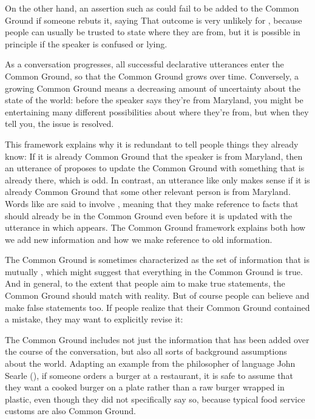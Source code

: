 On the other hand, an assertion such as  could fail to be added to the Common Ground if someone rebuts it, saying   That outcome is very unlikely for , because people can usually be trusted to state where they are from, but it is possible in principle if the speaker is confused or lying.

As a conversation progresses, all successful declarative utterances enter the Common Ground, so that the Common Ground grows over time.  Conversely, a growing Common Ground means a decreasing amount of uncertainty about the state of the world: before the speaker says they're from Maryland,   you might be entertaining many different possibilities about where they're from, but when they tell you, the issue is resolved.  

This framework explains why it is redundant to tell people things they already know: If it is already Common Ground that the speaker is from Maryland, then an utterance of  proposes to update the Common Ground with something that is already there, which is odd.  In contrast, an utterance like  only makes sense if it is already Common Ground that some other relevant person is from Maryland.  Words like  are said to involve , meaning that they make reference to facts that should already be in the Common Ground even before it is updated with the utterance in which  appears. The Common Ground framework explains both how we add new information and how we make reference to old information.


The Common Ground is sometimes characterized as the set of information that is mutually , which might suggest that everything in the Common Ground is true.  And in general, to the extent that people aim to make true statements, the Common Ground should  match with reality.  But of course people can believe and make false statements too.  If people realize that their Common Ground contained a mistake, they may want to explicitly revise it:   

The Common Ground includes not just the information that has been added over the course of the conversation, but also all sorts of background assumptions about the world.  Adapting an example from the philosopher of language John Searle (\citeyear{Searle:1994}), if someone  orders a burger at a restaurant, it is safe to assume that they want a cooked burger on a plate rather than a raw burger wrapped in plastic, even though they did not specifically say so, because typical food service customs are also Common Ground.

